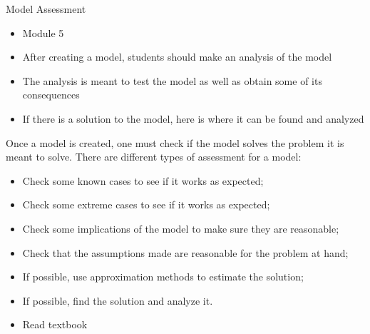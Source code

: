 \begin{module}{Model Assessment}
	\label{analysis}

\begin{siam}
	
	
\end{siam}

\end{module}




\begin{lesson}

	\begin{itemize}
		\item Module 5
	\end{itemize}

	\begin{itemize}
		\item After creating a model, students should make an analysis of the model
		\item The analysis is meant to test the model as well as obtain some of its consequences
		\item If there is a solution to the model, here is where it can be found and analyzed
	\end{itemize}
	


Once a model is created, one must check if the model solves the problem it is meant to solve.
There are different types of assessment for a model:
\begin{itemize}
	\item Check some known cases to see if it works as expected;
	\item Check some extreme cases to see if it works as expected;
	\item Check some implications of the model to make sure they are reasonable;
	\item Check that the assumptions made are reasonable for the problem at hand;
	\item If possible, use approximation methods to estimate the solution;
	\item If possible, find the solution and analyze it.
\end{itemize}


\begin{itemize}
	\item Read textbook
\end{itemize}



\end{lesson}
